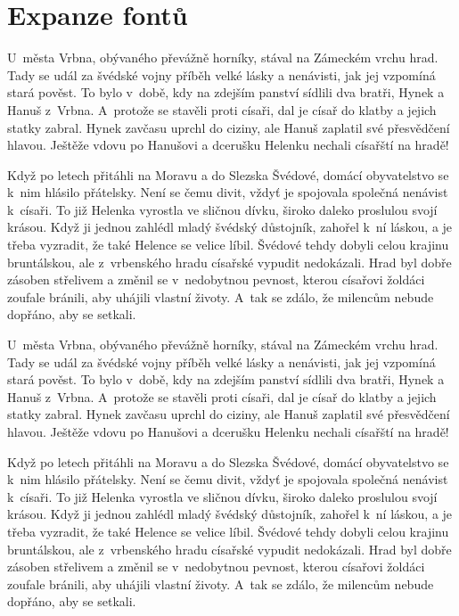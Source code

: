 \documentclass{article}
\begin{document}
  \section{Expanze fontů}
  \begin{multicols}{2}
    U~města Vrbna, obývaného převážně horníky, stával na Zámeckém vrchu hrad.
    Tady se udál za švédské vojny příběh velké lásky a nenávisti, jak jej
    vzpomíná stará pověst.  To bylo v~době, kdy na zdejším panství sídlili dva
    bratři, Hynek a Hanuš z~Vrbna. A~protože se stavěli proti císaři, dal je
    císař do klatby a jejich statky zabral. Hynek zavčasu uprchl do ciziny, ale
    Hanuš zaplatil své přesvědčení hlavou. Ještěže vdovu po Hanušovi a dcerušku
    Helenku nechali císařští na hradě!

    Když po letech přitáhli na Moravu a do Slezska Švédové, domácí obyvatelstvo
    se k~nim hlásilo přátelsky. Není se čemu divit, vždyť je spojovala společná
    nenávist k~císaři. To již Helenka vyrostla ve sličnou dívku, široko daleko
    proslulou svojí krásou. Když ji jednou zahlédl mladý švédský důstojník,
    zahořel k~ní láskou, a je třeba vyzradit, že také Helence se velice líbil.
    Švédové tehdy dobyli celou krajinu bruntálskou, ale z~vrbenského hradu
    císařské vypudit nedokázali. Hrad byl dobře zásoben střelivem a změnil se
    v~nedobytnou pevnost, kterou císařovi žoldáci zoufale bránili, aby uhájili
    vlastní životy. A~tak se zdálo, že milencům nebude dopřáno, aby se setkali.
    \columnbreak

    U~města Vrbna, obývaného převážně horníky, stával na Zámeckém vrchu hrad.
    Tady se udál za švédské vojny příběh velké lásky a nenávisti, jak jej
    vzpomíná stará pověst.  To bylo v~době, kdy na zdejším panství sídlili dva
    bratři, Hynek a Hanuš z~Vrbna. A~protože se stavěli proti císaři, dal je
    císař do klatby a jejich statky zabral. Hynek zavčasu uprchl do ciziny, ale
    Hanuš zaplatil své přesvědčení hlavou. Ještěže vdovu po Hanušovi a dcerušku
    Helenku nechali císařští na hradě!

    Když po letech přitáhli na Moravu a do Slezska Švédové, domácí obyvatelstvo
    se k~nim hlásilo přátelsky. Není se čemu divit, vždyť je spojovala společná
    nenávist k~císaři. To již Helenka vyrostla ve sličnou dívku, široko daleko
    proslulou svojí krásou. Když ji jednou zahlédl mladý švédský důstojník,
    zahořel k~ní láskou, a je třeba vyzradit, že také Helence se velice líbil.
    Švédové tehdy dobyli celou krajinu bruntálskou, ale z~vrbenského hradu
    císařské vypudit nedokázali. Hrad byl dobře zásoben střelivem a změnil se
    v~nedobytnou pevnost, kterou císařovi žoldáci zoufale bránili, aby uhájili
    vlastní životy. A~tak se zdálo, že milencům nebude dopřáno, aby se setkali.
  \end{multicols}
  
\end{document}
